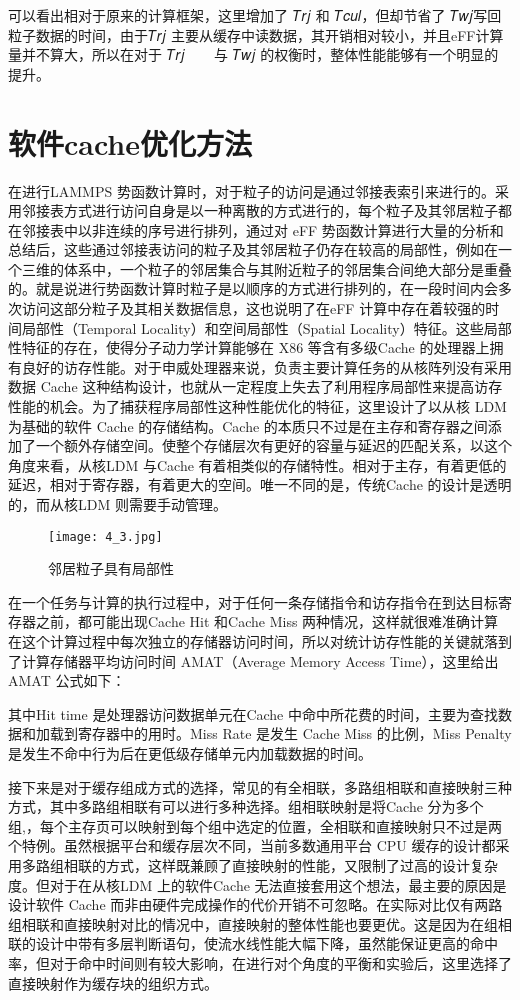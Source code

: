 可以看出相对于原来的计算框架，这里增加了 𝑇𝑟𝑗 和 𝑇𝑐𝑢𝑙，但却节省了 𝑇𝑤𝑗写回粒子数据的时间，由于𝑇𝑟𝑗 主要从缓存中读数据，其开销相对较小，并且eFF计算量并不算大，所以在对于 𝑇𝑟𝑗 􀀁𝑇𝑐𝑢𝑙 与 𝑇𝑤𝑗 的权衡时，整体性能能够有一个明显的提升。

\section{软件cache优化方法}
在进行LAMMPS 势函数计算时，对于粒子的访问是通过邻接表索引来进行的。采用邻接表方式进行访问自身是以一种离散的方式进行的，每个粒子及其邻居粒子都在邻接表中以非连续的序号进行排列，通过对 eFF 势函数计算进行大量的分析和总结后，这些通过邻接表访问的粒子及其邻居粒子仍存在较高的局部性，例如在一个三维的体系中，一个粒子的邻居集合与其附近粒子的邻居集合间绝大部分是重叠的。就是说进行势函数计算时粒子是以顺序的方式进行排列的，在一段时间内会多次访问这部分粒子及其相关数据信息，这也说明了在eFF 计算中存在着较强的时间局部性（Temporal Locality）和空间局部性（Spatial Locality）特征。这些局部性特征的存在，使得分子动力学计算能够在 X86 等含有多级Cache 的处理器上拥有良好的访存性能。对于申威处理器来说，负责主要计算任务的从核阵列没有采用数据 Cache 这种结构设计，也就从一定程度上失去了利用程序局部性来提高访存性能的机会。为了捕获程序局部性这种性能优化的特征，这里设计了以从核 LDM 为基础的软件 Cache 的存储结构。Cache 的本质只不过是在主存和寄存器之间添加了一个额外存储空间。使整个存储层次有更好的容量与延迟的匹配关系，以这个角度来看，从核LDM 与Cache 有着相类似的存储特性。相对于主存，有着更低的延迟，相对于寄存器，有着更大的空间。唯一不同的是，传统Cache 的设计是透明的，而从核LDM 则需要手动管理。

 \begin{figure}[h]
  \centering
  \texttt{[image: 4\_3.jpg]}
  \caption{邻居粒子具有局部性}
  \label{fig:badge}
\end{figure}

在一个任务与计算的执行过程中，对于任何一条存储指令和访存指令在到达目标寄存器之前，都可能出现Cache Hit 和Cache Miss 两种情况，这样就很难准确计算在这个计算过程中每次独立的存储器访问时间，所以对统计访存性能的关键就落到了计算存储器平均访问时间 AMAT（Average Memory Access Time），这里给出 AMAT 公式如下：

其中Hit time 是处理器访问数据单元在Cache 中命中所花费的时间，主要为查找数据和加载到寄存器中的用时。Miss Rate 是发生 Cache Miss 的比例，Miss Penalty 是发生不命中行为后在更低级存储单元内加载数据的时间。

接下来是对于缓存组成方式的选择，常见的有全相联，多路组相联和直接映射三种方式，其中多路组相联有可以进行多种选择。组相联映射是将Cache 分为多个组,，每个主存页可以映射到每个组中选定的位置，全相联和直接映射只不过是两个特例。虽然根据平台和缓存层次不同，当前多数通用平台 CPU 缓存的设计都采用多路组相联的方式，这样既兼顾了直接映射的性能，又限制了过高的设计复杂度。但对于在从核LDM 上的软件Cache 无法直接套用这个想法，最主要的原因是设计软件 Cache 而非由硬件完成操作的代价开销不可忽略。在实际对比仅有两路组相联和直接映射对比的情况中，直接映射的整体性能也要更优。这是因为在组相联的设计中带有多层判断语句，使流水线性能大幅下降，虽然能保证更高的命中率，但对于命中时间则有较大影响，在进行对个角度的平衡和实验后，这里选择了直接映射作为缓存块的组织方式。

